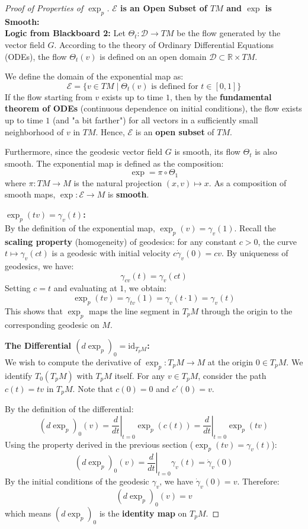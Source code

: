 \documentclass[11pt, a4paper]{article}
\theoremstyle{plain}
\theoremstyle{definition}
\theoremstyle{remark}
\begin{document}
\begin{proof}[Proof of Properties of $\exp_p$]
\vspace{0.5em}\noindent\textbf{$\mathcal{E}$ is an Open Subset of $TM$ and $\exp$ is Smooth:} \\
\textbf{Logic from Blackboard 2:}
Let $\Theta_t: \mathcal{D} \to TM$ be the flow generated by the vector field $G$. According to the theory of Ordinary Differential Equations (ODEs), the flow $\Theta_t(v)$ is defined on an open domain $\mathcal{D} \subset \mathbb{R} \times TM$.

We define the domain of the exponential map as:
\[ \mathcal{E} = \{ v \in TM \mid \Theta_t(v) \text{ is defined for } t \in [0, 1] \} \]
If the flow starting from $v$ exists up to time $1$, then by the \textbf{fundamental theorem of ODEs} (continuous dependence on initial conditions), the flow exists up to time $1$ (and "a bit farther") for all vectors in a sufficiently small neighborhood of $v$ in $TM$. Hence, $\mathcal{E}$ is an \textbf{open subset} of $TM$.

Furthermore, since the geodesic vector field $G$ is smooth, its flow $\Theta_t$ is also smooth. The exponential map is defined as the composition:
\[ \exp = \pi \circ \Theta_1 \]
where $\pi: TM \to M$ is the natural projection $(x, v) \mapsto x$. As a composition of smooth maps, $\exp: \mathcal{E} \to M$ is \textbf{smooth}.

\vspace{0.5em}\noindent\textbf{$\exp_p(tv) = \gamma_v(t)$:} \\
By the definition of the exponential map, $\exp_p(v) = \gamma_v(1)$. 
Recall the \textbf{scaling property} (homogeneity) of geodesics: for any constant $c > 0$, the curve $t \mapsto \gamma_v(ct)$ is a geodesic with initial velocity $c \dot{\gamma}_v(0) = cv$. By uniqueness of geodesics, we have:
\[ \gamma_{cv}(t) = \gamma_v(ct) \]
Setting $c=t$ and evaluating at $1$, we obtain:
\[ \exp_p(tv) = \gamma_{tv}(1) = \gamma_v(t \cdot 1) = \gamma_v(t) \]
This shows that $\exp_p$ maps the line segment in $T_p M$ through the origin to the corresponding geodesic on $M$.

\vspace{0.5em}\noindent\textbf{The Differential $(d\exp_p)_0 = \text{id}_{T_p M}$:} \\
We wish to compute the derivative of $\exp_p: T_p M \to M$ at the origin $0 \in T_p M$. We identify $T_0(T_p M)$ with $T_p M$ itself. For any $v \in T_p M$, consider the path $c(t) = tv$ in $T_p M$. Note that $c(0)=0$ and $c'(0)=v$.

By the definition of the differential:
\[ (d\exp_p)_0 (v) = \left. \frac{d}{dt} \right|_{t=0} \exp_p(c(t)) = \left. \frac{d}{dt} \right|_{t=0} \exp_p(tv) \]
Using the property derived in the previous section ($\exp_p(tv) = \gamma_v(t)$):
\[ (d\exp_p)_0 (v) = \left. \frac{d}{dt} \right|_{t=0} \gamma_v(t) = \dot{\gamma}_v(0) \]
By the initial conditions of the geodesic $\gamma_v$, we have $\dot{\gamma}_v(0) = v$. 
Therefore:
\[ (d\exp_p)_0 (v) = v \]
which means $(d\exp_p)_0$ is the \textbf{identity map} on $T_p M$.
\end{proof}
\end{document}
